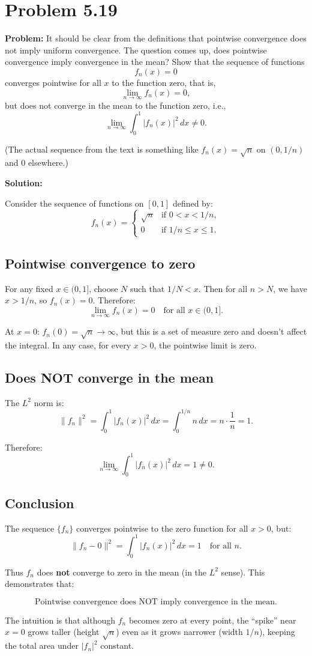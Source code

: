 \documentclass[12pt]{article}
\begin{document}
\section*{Problem 5.19}

\textbf{Problem:} It should be clear from the definitions that pointwise convergence does not imply uniform convergence. The question comes up, does pointwise convergence imply convergence in the mean? Show that the sequence of functions
\[
f_n(x) = 0
\]
converges pointwise for all $x$ to the function zero, that is,
\[
\lim_{n\to\infty} f_n(x) = 0,
\]
but does not converge in the mean to the function zero, i.e.,
\[
\lim_{n\to\infty}\int_0^1 |f_n(x)|^2\,dx \neq 0.
\]

(The actual sequence from the text is something like $f_n(x) = \sqrt{n}$ on $(0,1/n)$ and $0$ elsewhere.)

\bigskip
\textbf{Solution:}

Consider the sequence of functions on $[0,1]$ defined by:
\[
f_n(x) = \begin{cases} \sqrt{n} & \text{if } 0 < x < 1/n, \\ 0 & \text{if } 1/n \leq x \leq 1. \end{cases}
\]

\subsection*{Pointwise convergence to zero}

For any fixed $x \in (0,1]$, choose $N$ such that $1/N < x$. Then for all $n > N$, we have $x > 1/n$, so $f_n(x) = 0$. Therefore:
\[
\lim_{n\to\infty} f_n(x) = 0 \quad \text{for all } x \in (0,1].
\]

At $x = 0$: $f_n(0) = \sqrt{n} \to \infty$, but this is a set of measure zero and doesn't affect the integral. In any case, for every $x > 0$, the pointwise limit is zero.

\subsection*{Does NOT converge in the mean}

The $L^2$ norm is:
\[
\|f_n\|^2 = \int_0^1 |f_n(x)|^2\,dx = \int_0^{1/n} n\,dx = n \cdot \frac{1}{n} = 1.
\]

Therefore:
\[
\lim_{n\to\infty}\int_0^1|f_n(x)|^2\,dx = 1 \neq 0.
\]

\subsection*{Conclusion}

The sequence $\{f_n\}$ converges pointwise to the zero function for all $x > 0$, but:
\[
\|f_n - 0\|^2 = \int_0^1|f_n(x)|^2\,dx = 1 \quad \text{for all } n.
\]

Thus $f_n$ does \textbf{not} converge to zero in the mean (in the $L^2$ sense). This demonstrates that:

\[
\boxed{\text{Pointwise convergence does NOT imply convergence in the mean.}}
\]

The intuition is that although $f_n$ becomes zero at every point, the ``spike'' near $x = 0$ grows taller (height $\sqrt{n}$) even as it grows narrower (width $1/n$), keeping the total area under $|f_n|^2$ constant.
\end{document}
